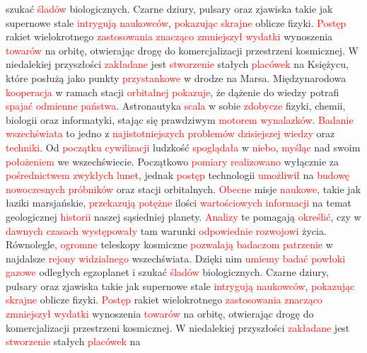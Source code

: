 \documentclass[12pt,a4paper]{article}
\begin{document}
szukać \textcolor{red}{śladów} biologicznych. Czarne dziury, pulsary oraz zjawiska takie jak supernowe stale \textcolor{red}{intrygują} \textcolor{red}{naukowców}, \textcolor{red}{pokazując} \textcolor{red}{skrajne} oblicze fizyki. \textcolor{red}{Postęp} rakiet wielokrotnego \textcolor{red}{zastosowania} \textcolor{red}{znacząco} \textcolor{red}{zmniejszył} \textcolor{red}{wydatki} wynoszenia \textcolor{red}{towarów} na orbitę, otwierając drogę do komercjalizacji przestrzeni kosmicznej. W niedalekiej przyszłości \textcolor{red}{zakładane} jest \textcolor{red}{stworzenie} stałych \textcolor{red}{placówek} na Księżycu, które posłużą jako punkty \textcolor{red}{przystankowe} w drodze na Marsa. Międzynarodowa \textcolor{red}{kooperacja} w ramach stacji \textcolor{red}{orbitalnej} \textcolor{red}{pokazuje}, że dążenie do wiedzy potrafi \textcolor{red}{spajać} \textcolor{red}{odmienne} \textcolor{red}{państwa}. Astronautyka \textcolor{red}{scala} w sobie \textcolor{red}{zdobycze} fizyki, chemii, biologii oraz informatyki, stając się prawdziwym \textcolor{red}{motorem} \textcolor{red}{wynalazków}. \textcolor{red}{Badanie} \textcolor{red}{wszechświata} to jedno z \textcolor{red}{najistotniejszych} \textcolor{red}{problemów} \textcolor{red}{dzisiejszej} \textcolor{red}{wiedzy} oraz \textcolor{red}{techniki}. Od \textcolor{red}{początku} \textcolor{red}{cywilizacji} ludzkość \textcolor{red}{spoglądała} w \textcolor{red}{niebo}, \textcolor{red}{myśląc} nad swoim \textcolor{red}{położeniem} we wszechświecie. Początkowo \textcolor{red}{pomiary} \textcolor{red}{realizowano} wyłącznie za \textcolor{red}{pośrednictwem} \textcolor{red}{zwykłych} \textcolor{red}{lunet}, jednak \textcolor{red}{postęp} technologii \textcolor{red}{umożliwił} na \textcolor{red}{budowę} \textcolor{red}{nowoczesnych} \textcolor{red}{próbników} oraz stacji orbitalnych. \textcolor{red}{Obecne} misje \textcolor{red}{naukowe}, takie jak łaziki marsjańskie, \textcolor{red}{przekazują} \textcolor{red}{potężne} ilości \textcolor{red}{wartościowych} \textcolor{red}{informacji} na temat geologicznej \textcolor{red}{historii} naszej sąsiedniej planety. \textcolor{red}{Analizy} te pomagają \textcolor{red}{określić}, czy w \textcolor{red}{dawnych} \textcolor{red}{czasach} \textcolor{red}{występowały} tam warunki \textcolor{red}{odpowiednie} \textcolor{red}{rozwojowi} życia. Równolegle, \textcolor{red}{ogromne} teleskopy kosmiczne \textcolor{red}{pozwalają} \textcolor{red}{badaczom} \textcolor{red}{patrzenie} w najdalsze \textcolor{red}{rejony} \textcolor{red}{widzialnego} wszechświata. Dzięki nim \textcolor{red}{umiemy} \textcolor{red}{badać} \textcolor{red}{powłoki} \textcolor{red}{gazowe} odległych egzoplanet i szukać \textcolor{red}{śladów} biologicznych. Czarne dziury, pulsary oraz zjawiska takie jak supernowe stale \textcolor{red}{intrygują} \textcolor{red}{naukowców}, \textcolor{red}{pokazując} \textcolor{red}{skrajne} oblicze fizyki. \textcolor{red}{Postęp} rakiet wielokrotnego \textcolor{red}{zastosowania} \textcolor{red}{znacząco} \textcolor{red}{zmniejszył} \textcolor{red}{wydatki} wynoszenia \textcolor{red}{towarów} na orbitę, otwierając drogę do komercjalizacji przestrzeni kosmicznej. W niedalekiej przyszłości \textcolor{red}{zakładane} jest \textcolor{red}{stworzenie} stałych \textcolor{red}{placówek} na 
\end{document}

